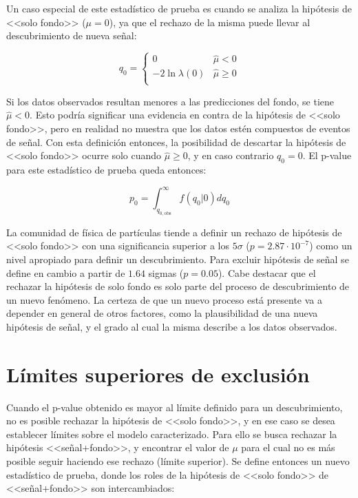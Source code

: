 Un caso especial de este estadístico de prueba es cuando se analiza la hipótesis de <<solo fondo>> ($\mu=0$), ya que el rechazo de la misma puede llevar al descubrimiento de nueva señal:

\begin{equation}
	q_{0}=
	\begin{cases}
		0 & \hat{\mu}<0 \\
		-2\ln{\lambda(0)} & \hat{\mu}\ge0\\
	\end{cases}
	\label{eq:st_q0}
\end{equation}

Si los datos observados resultan menores a las predicciones del fondo, se tiene $\hat{\mu}<0$. Esto podría significar una evidencia en contra de la hipótesis de <<solo fondo>>, pero en realidad no muestra que los datos estén compuestos de eventos de señal. Con esta definición entonces, la posibilidad de descartar la hipótesis de <<solo fondo>> ocurre solo cuando $\hat{\mu}\ge0$, y en caso contrario $q_{0}=0$. El p-value para este estadístico de prueba queda entonces:

\begin{equation}
	p_0 = \int_{q_{0, \text{obs}}}^{\infty} f(q_0|0)dq_0
	\label{ec:pvalue_0}
\end{equation}

La comunidad de física de partículas tiende a definir un rechazo de hipótesis de <<solo fondo>> con una significancia superior a los $5\sigma$ ($p=2.87 \cdot 10^{-7}$) como un nivel apropiado para definir un descubrimiento. Para excluir hipótesis de señal se define en cambio a partir de $1.64$ sigmas ($p=0.05$). Cabe destacar que el rechazar la hipótesis de solo fondo es solo parte del proceso de descubrimiento de un nuevo fenómeno. La certeza de que un nuevo proceso está presente va a depender en general de otros factores, como la plausibilidad de una nueva hipótesis de señal, y el grado al cual la misma describe a los datos observados.

\section{Límites superiores de exclusión}

Cuando el p-value obtenido es mayor al límite definido para un descubrimiento, no es posible rechazar la hipótesis de <<solo fondo>>, y en ese caso se desea establecer límites sobre el modelo caracterizado. Para ello se busca rechazar la hipótesis <<señal+fondo>>, y encontrar el valor de $\mu$ para el cual no es más posible seguir haciendo ese rechazo (límite superior). Se define entonces un nuevo estadístico de prueba, donde los roles de la hipótesis de <<solo fondo>> de <<señal+fondo>> son intercambiados:


